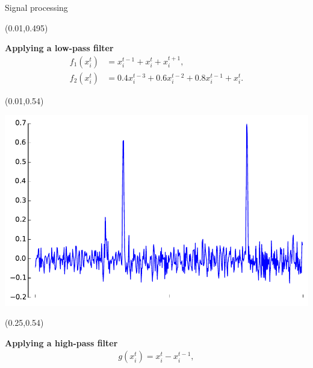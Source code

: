\documentclass[final]{beamer}
\newenvironment{shaded2}{%
  \def\FrameCommand{\fboxsep=\FrameSep \colorbox{blue!20}}%
  \MakeFramed {\FrameRestore}}%
 {\endMakeFramed}
\begin{document}
\begin{frame}{}
\begin{textblock}{0.485}
\begin{block}{Signal processing \phantom{p}}
\begin{textblock}{0.485}(0.01,0.495)
\begin{minipage}{0.48\linewidth}
\begin{shaded2}
\vspace{1pt}
{\color{lightgreen} \textbf{Applying a low-pass filter}}
\vspace{-5pt}
\begin{align*}
f_1(x^t_i) &= x^{t-1}_i + x^t_i + x^{t+1}_i,\\
f_2(x^t_i) &= 0.4 x^{t-3}_i + 0.6 x^{t-2}_i + 0.8 x^{t-1}_i + x_i^t.
\end{align*}
\vspace{-10pt}
\end{shaded2}
\end{minipage}
\end{textblock}

\begin{textblock}{0.485}(0.01,0.54)
\begin{minipage}{0.48\linewidth}
\begin{shaded}
\begin{center}

\includegraphics[width=0.85\linewidth]{images/diff_curve.pdf}
\end{center}
\end{shaded}
\end{minipage}
\end{textblock}

\begin{textblock}{0.485}(0.25,0.54)
\begin{minipage}{0.48\linewidth}
\begin{shaded}
\vspace{3pt}
{\color{lightgreen} \textbf{Applying a high-pass filter}}
\begin{align*}
g(x^{t}_{i}) = x^{t}_i - x^{t-1}_i,
\end{align*}
\vspace{5pt}
\end{shaded}
\end{minipage}
\end{textblock}


\end{block}
\end{textblock}
\end{frame}
\end{document}
